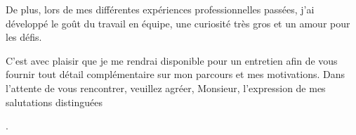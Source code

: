\documentclass{letter}
\begin{document}
\begin{letter}
De plus, lors de mes différentes expériences professionnelles passées, j'ai développé
le goût du travail en équipe, une curiosité très gros et un amour pour les défis.

C'est avec plaisir que je me rendrai disponible pour un entretien afin de vous
fournir tout détail complémentaire sur mon parcours et mes motivations. Dans l'attente
de vous rencontrer, veuillez agréer, Monsieur, l'expression de mes salutations
distinguées

\closing{.}
\end{letter}
\end{document}
